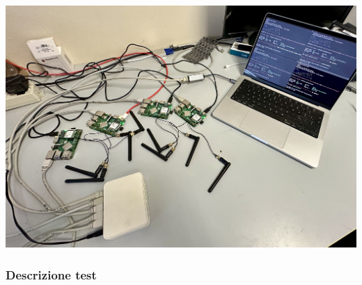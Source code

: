 \documentclass{beamer}
\begin{document}
\begin{frame}
\begin{minipage}{0.35\textwidth}
        \vspace{0.5cm}
        \includegraphics[width=\textwidth]{topology_photo.jpg} %
    \end{minipage}
\end{frame}

\begin{frame}
    \frametitle{Descrizione test}
\end{frame}
\end{document}
